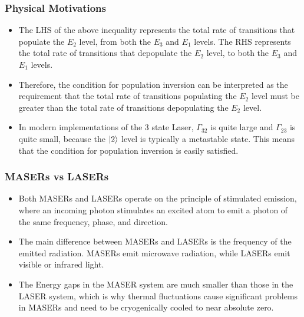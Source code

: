 \documentclass{beamer}
\begin{document}
\begin{frame}
    \frametitle{Physical Motivations}
        \begin{itemize}
            \item The LHS of the above inequality represents the total rate of transitions that populate the $E_{2}$ level, from both the $E_{3}$ and $E_{1}$ levels. The RHS represents the total rate of transitions that depopulate the $E_{2}$ level, to both the $E_{3}$ and $E_{1}$ levels. \pause
            \item Therefore, the condition for population inversion can be interpreted as the requirement that the total rate of transitions populating the $E_{2}$ level must be greater than the total rate of transitions depopulating the $E_{2}$ level. \pause
            \item In modern implementations of the 3 state Laser, $\Gamma_{32}$ is quite large and $\Gamma_{23}$ is quite small, because the $\ket{2}$ level is typically a metastable state. This means that the condition for population inversion is easily satisfied.
        \end{itemize}
    \end{frame}

\begin{frame}
    \frametitle{MASERs vs LASERs}
    \begin{itemize}
        \item Both MASERs and LASERs operate on the principle of stimulated emission, where an incoming photon stimulates an excited atom to emit a photon of the same frequency, phase, and direction. \pause
        \item The main difference between MASERs and LASERs is the frequency of the emitted radiation. MASERs emit microwave radiation, while LASERs emit visible or infrared light. \pause
        \item The Energy gaps in the MASER system are much smaller than those in the LASER system, which is why thermal fluctuations cause significant problems in MASERs and need to be cryogenically cooled to near absolute zero. \pause
        \end{itemize}
    \end{frame}
\end{document}
